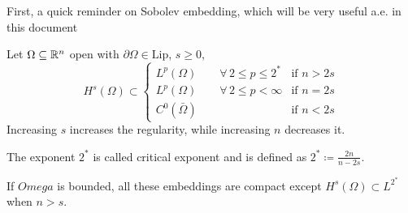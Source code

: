     First, a quick reminder on Sobolev embedding, which will be very useful a.e. in this document
    \begin{remark}\label{sobolev_embedding}
        Let \(\Omega \subseteq \mathbb{R}^n\) open with \(\partial\Omega \in \text{Lip}\), \(s \geq 0\),
        \[
            H^s(\Omega) \subset 
            \begin{cases}
                L^p(\Omega) \qquad \forall \, 2 \leq p \leq 2^* & \text{if } n > 2s \\
                L^p(\Omega) \qquad \forall \, 2 \leq p < \infty & \text{if } n = 2s \\
                C^0(\bar{\Omega})  & \text{if } n < 2s
            \end{cases}
        \]
        Increasing \(s\) increases the regularity, while increasing \(n\) decreases it.
    
        The exponent \(2^*\) is called critical exponent and is defined as \(2^* \coloneqq \frac{2n}{n - 2s}\).
    
        If \(Omega\) is bounded, all these embeddings are compact except \(H^s(\Omega) \subset L^{2^*}\) when \(n > s\).
    \end{remark}
    
